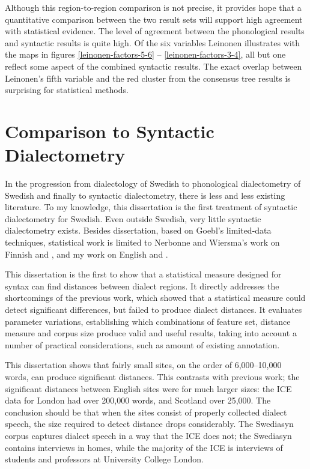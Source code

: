 Although this region-to-region comparison is not precise, it provides
hope that a quantitative comparison between the two result sets will
support high agreement with statistical evidence. The level of
agreement between the phonological results and syntactic results is
quite high. Of the six variables Leinonen illustrates with the maps in
figures \ref{leinonen-factors-5-6} -- \ref{leinonen-factors-3-4}, all
but one reflect some aspect of the combined syntactic results. The
exact overlap between Leinonen's fifth variable and the red cluster
from the consensus tree results is surprising for statistical methods.

\section{Comparison to Syntactic Dialectometry}

In the progression from dialectology of Swedish to phonological
dialectometry of Swedish and finally to syntactic dialectometry, there
is less and less existing literature. To my knowledge, this
dissertation is the first treatment of syntactic dialectometry for
Swedish. Even outside Swedish, very little syntactic dialectometry
exists. Besides  dissertation, based on Goebl's
limited-data techniques, statistical work is limited to Nerbonne and
Wiersma's work on Finnish \cite{nerbonne06} and \cite{wiersma09}, and
my work on English \cite{sanders07} and \cite{sanders08b}.

This dissertation is the first to show that a statistical measure
designed for syntax can find distances between dialect regions. It
directly addresses the shortcomings of the previous work, which showed
that a statistical measure could detect significant differences, but failed to
produce dialect distances. It evaluates
parameter variations, establishing which combinations of feature set,
distance measure and corpus size produce valid and useful results,
taking into account a number of practical considerations, such as
amount of existing annotation.

This dissertation shows that fairly small sites, on the order of
6,000--10,000 words, can produce significant distances. This contrasts
with previous work; the significant distances between English sites
were for much larger sizes: the ICE data for London had over 200,000
words, and Scotland over 25,000. The conclusion should be that when
the sites consist of properly collected dialect speech, the size
required to detect distance drops considerably. The Swediasyn corpus
captures dialect speech in a way that the ICE does not; the Swediasyn
contains interviews in homes, while the majority of the ICE is
interviews of students and professors at University College London.

